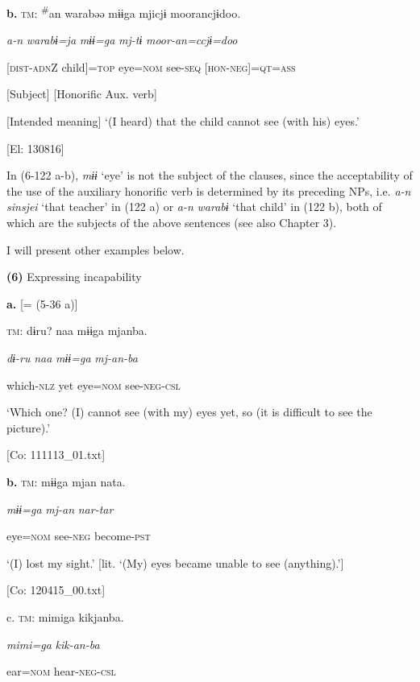   \textbf{b.}  \textsc{tm}:  \textsuperscript{\#}an  warabəə  mɨɨga  mjicjɨ  moorancjɨdoo.

       \textit{a-n}  \textit{warabɨ=ja}  \textit{mɨɨ=ga}  \textit{mj-tɨ}  \textit{moor-an=ccjɨ=doo}

      [\textsc{dist}-\textsc{adn}Z  child]=\textsc{top}  eye=\textsc{nom}  see-\textsc{seq}  [\textsc{hon}-\textsc{neg}]=\textsc{qt}=\textsc{ass}

      [Subject]      [Honorific Aux. verb]

      [Intended meaning] ‘(I heard) that the child cannot see (with his) eyes.’

      [El: 130816]

In (6-122 a-b), \textit{mɨɨ} ‘eye’ is not the subject of the clauses, since the acceptability of the use of the auxiliary honorific verb is determined by its preceding NPs, i.e. \textit{a-n} \textit{sinsjei} ‘that teacher’ in (122 a) or \textit{a-n} \textit{warabɨ} ‘that child’ in (122 b), both of which are the subjects of the above sentences (see also Chapter 3).

  I will present other examples below.

\textbf{(6)}  Expressing incapability

  \textbf{a.}  [= (5-36 a)]

    \textsc{tm}:  dɨru?  naa  mɨɨga  mjanba.

      \textit{dɨ-ru}  \textit{naa}  \textit{mɨɨ=ga}  \textit{mj-an{}-ba}

      which-\textsc{nlz}  yet  eye=\textsc{nom}  see-\textsc{neg}-\textsc{csl}

      ‘Which one? (I) cannot see (with my) eyes yet, so (it is difficult to see the picture).’

      [Co: 111113\_01.txt]

  \textbf{b.}  \textsc{tm}:  mɨɨga  mjan  nata.

      \textit{mɨɨ=ga}  \textit{mj-an}  \textit{nar-tar}

      eye=\textsc{nom}  see-\textsc{neg}  become-\textsc{pst}

      ‘(I) lost my sight.’ [lit. ‘(My) eyes became unable to see (anything).’]

      [Co: 120415\_00.txt]

  c.  \textsc{tm}:  mimiga  kikjanba.

      \textit{mimi=ga}  \textit{kik-an{}-ba}

      ear=\textsc{nom}  hear-\textsc{neg}-\textsc{csl}


